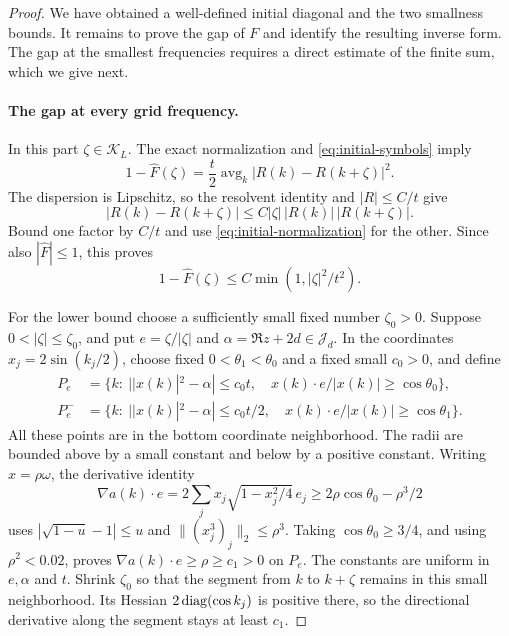 \begin{proof}
We have obtained a well-defined initial diagonal and the two smallness
bounds.  It remains to prove the gap of $F$ and identify the resulting
inverse form.  The gap at the smallest frequencies requires a direct
estimate of the finite sum, which we give next.

\paragraph{The gap at every grid frequency.}
In this part $\zeta\in\mathcal K_L$.
The exact normalization and \eqref{eq:initial-symbols} imply
\begin{equation}\label{eq:initial-gap-identity}
 1-\widehat F(\zeta)
   =\frac t2\operatorname{avg}_k|R(k)-R(k+\zeta)|^2.
\end{equation}
The dispersion is Lipschitz, so the resolvent identity and
$|R|\le C/t$ give
\[
 |R(k)-R(k+\zeta)|
 \le C|\zeta|\,|R(k)|\,|R(k+\zeta)|.
\]
Bound one factor by $C/t$ and use
\eqref{eq:initial-normalization} for the other.  Since also
$|\widehat F|\le1$, this proves
\begin{equation}\label{eq:initial-gap-upper}
 1-\widehat F(\zeta)\le C\min(1,|\zeta|^2/t^2).
\end{equation}

For the lower bound choose a sufficiently small fixed number
$\zeta_0>0$. Suppose $0<|\zeta|\le\zeta_0$, and put
$e=\zeta/|\zeta|$ and $\alpha=\Re z+2d\in\mathcal J_d$.
In the coordinates $x_j=2\sin(k_j/2)$, choose fixed
$0<\theta_1<\theta_0$ and a fixed small $c_0>0$, and define
\[
 \begin{split}
 P_e&=\{k:\ ||x(k)|^2-\alpha|\le c_0t,\quad
                  x(k)\cdot e/|x(k)|\ge\cos\theta_0\},\\
 P_e^-&=\{k:\ ||x(k)|^2-\alpha|\le c_0t/2,\quad
                  x(k)\cdot e/|x(k)|\ge\cos\theta_1\}.
 \end{split}
\]
All these points are in the bottom coordinate neighborhood. The radii
are bounded above by a small constant and below by a positive constant.
Writing $x=\rho\omega$, the derivative identity
\[
 \nabla a(k)\cdot e
 =2\sum_j x_j\sqrt{1-x_j^2/4}\,e_j
 \ge 2\rho\cos\theta_0-\rho^3/2
\]
uses $|\sqrt{1-u}-1|\le u$ and
$\|(x_j^3)_j\|_2\le\rho^3$. Taking $\cos\theta_0\ge3/4$,
and using $\rho^2<0.02$, proves
$\nabla a(k)\cdot e\ge\rho\ge c_1>0$ on $P_e$.
The constants are uniform
in $e,\alpha$ and $t$. Shrink $\zeta_0$ so that the segment from
$k$ to $k+\zeta$ remains in this small neighborhood. Its Hessian
$2\operatorname{diag}(\cos k_j)$ is positive there, so the directional derivative
along the segment stays at least $c_1$.


\end{proof}
